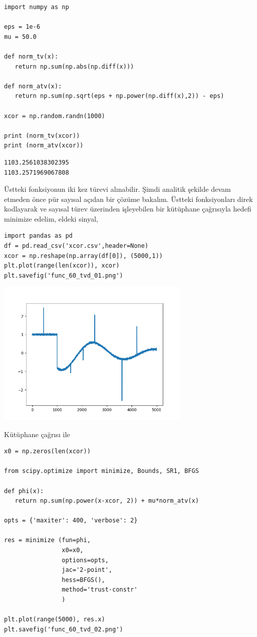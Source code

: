 \documentclass[12pt,fleqn]{article}\usepackage{../../common}
\begin{document}
\begin{verbatim}
import numpy as np

eps = 1e-6
mu = 50.0

def norm_tv(x):
   return np.sum(np.abs(np.diff(x)))
   
def norm_atv(x):
   return np.sum(np.sqrt(eps + np.power(np.diff(x),2)) - eps)
   
xcor = np.random.randn(1000)

print (norm_tv(xcor))
print (norm_atv(xcor))
\end{verbatim}

\begin{verbatim}
1103.2561038302395
1103.2571969067808
\end{verbatim}

Üstteki fonksiyonun iki kez türevi alınabilir. Şimdi analitik şekilde devam
etmeden önce pür sayısal açıdan bir çözüme bakalım. Üstteki fonksiyonları
direk kodlayarak ve sayısal türev üzerinden işleyebilen bir kütüphane
çağrısıyla hedefi minimize edelim, eldeki sinyal,

\begin{verbatim}
import pandas as pd
df = pd.read_csv('xcor.csv',header=None)
xcor = np.reshape(np.array(df[0]), (5000,1))
plt.plot(range(len(xcor)), xcor)
plt.savefig('func_60_tvd_01.png')
\end{verbatim}

\includegraphics[width=25em]{func_60_tvd_01.png}

Kütüphane çağrısı ile

\begin{verbatim}
x0 = np.zeros(len(xcor))

from scipy.optimize import minimize, Bounds, SR1, BFGS

def phi(x):
   return np.sum(np.power(x-xcor, 2)) + mu*norm_atv(x)

opts = {'maxiter': 400, 'verbose': 2}

res = minimize (fun=phi,
                x0=x0,
                options=opts,
                jac='2-point',
                hess=BFGS(),
                method='trust-constr'
                )

plt.plot(range(5000), res.x)
plt.savefig('func_60_tvd_02.png')
\end{verbatim}
\end{document}
